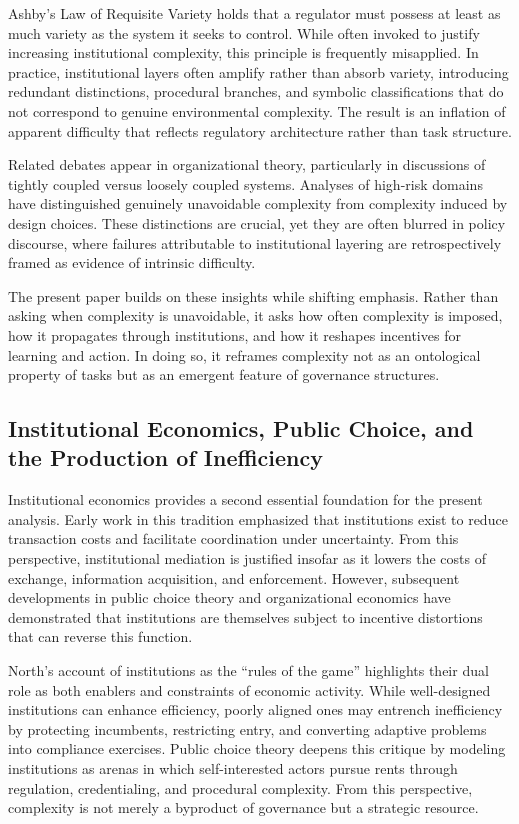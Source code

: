 \documentclass[11pt]{article}
\begin{document}
Ashby’s Law of Requisite Variety holds that a regulator must possess at least as much variety as the system it seeks to control. While often invoked to justify increasing institutional complexity, this principle is frequently misapplied. In practice, institutional layers often amplify rather than absorb variety, introducing redundant distinctions, procedural branches, and symbolic classifications that do not correspond to genuine environmental complexity. The result is an inflation of apparent difficulty that reflects regulatory architecture rather than task structure.

Related debates appear in organizational theory, particularly in discussions of tightly coupled versus loosely coupled systems. Analyses of high-risk domains have distinguished genuinely unavoidable complexity from complexity induced by design choices. These distinctions are crucial, yet they are often blurred in policy discourse, where failures attributable to institutional layering are retrospectively framed as evidence of intrinsic difficulty.

The present paper builds on these insights while shifting emphasis. Rather than asking when complexity is unavoidable, it asks how often complexity is imposed, how it propagates through institutions, and how it reshapes incentives for learning and action. In doing so, it reframes complexity not as an ontological property of tasks but as an emergent feature of governance structures.

\subsection{Institutional Economics, Public Choice, and the Production of Inefficiency}

Institutional economics provides a second essential foundation for the present analysis. Early work in this tradition emphasized that institutions exist to reduce transaction costs and facilitate coordination under uncertainty. From this perspective, institutional mediation is justified insofar as it lowers the costs of exchange, information acquisition, and enforcement. However, subsequent developments in public choice theory and organizational economics have demonstrated that institutions are themselves subject to incentive distortions that can reverse this function.

North’s account of institutions as the “rules of the game” highlights their dual role as both enablers and constraints of economic activity. While well-designed institutions can enhance efficiency, poorly aligned ones may entrench inefficiency by protecting incumbents, restricting entry, and converting adaptive problems into compliance exercises. Public choice theory deepens this critique by modeling institutions as arenas in which self-interested actors pursue rents through regulation, credentialing, and procedural complexity. From this perspective, complexity is not merely a byproduct of governance but a strategic resource.
\end{document}
